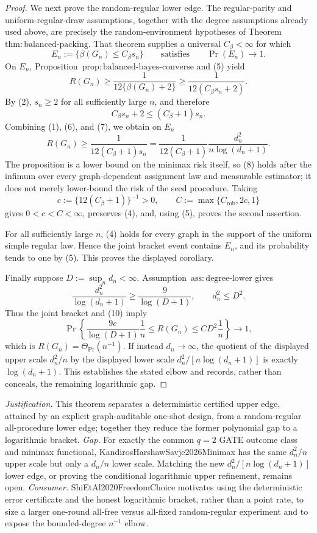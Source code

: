 \documentclass{article}
\begin{document}
\begin{proof}
We next prove the random-regular lower edge.  The regular-parity and uniform-regular-draw assumptions, together with the degree assumptions already used above, are precisely the random-environment hypotheses of Theorem~\(\mathrm{thm{:}balanced\mbox{-}packing}\).  That theorem supplies a universal \(C_\beta<\infty\) for which
\[
E_n:=\{\beta(G_n)\le C_\beta s_n\}
\qquad\text{satisfies}\qquad
\Pr(E_n)\longrightarrow1.
\tag{5}
\]
On \(E_n\), Proposition~\(\mathrm{prop{:}balanced\mbox{-}bayes\mbox{-}converse}\) and (5) yield
\[
R(G_n)
\ge \frac{1}{12\{\beta(G_n)+2\}}
\ge \frac{1}{12(C_\beta s_n+2)}.
\tag{6}
\]
By (2), \(s_n\ge2\) for all sufficiently large \(n\), and therefore
\[
C_\beta s_n+2\le(C_\beta+1)s_n.
\tag{7}
\]
Combining (1), (6), and (7), we obtain on \(E_n\)
\[
R(G_n)
\ge \frac{1}{12(C_\beta+1)s_n}
=\frac{1}{12(C_\beta+1)}
  \frac{d_n^2}{n\log(d_n+1)}.
\tag{8}
\]
The proposition is a lower bound on the minimax risk itself, so (8) holds after the infimum over every graph-dependent assignment law and measurable estimator; it does not merely lower-bound the risk of the seed procedure.  Taking
\[
c:=\{12(C_\beta+1)\}^{-1}>0,
\qquad
C:=\max\{C_{\mathrm{rob}},2c,1\}
\tag{9}
\]
gives \(0<c<C<\infty\), preserves (4), and, using (5), proves the second assertion.

For all sufficiently large \(n\), (4) holds for every graph in the support of the uniform simple regular law.  Hence the joint bracket event contains \(E_n\), and its probability tends to one by (5).  This proves the displayed corollary.

Finally suppose \(D:=\sup_n d_n<\infty\).  Assumption~\(\mathrm{ass{:}degree\mbox{-}lower}\) gives
\[
\frac{d_n^2}{\log(d_n+1)}\ge\frac{9}{\log(D+1)},
\qquad
d_n^2\le D^2.
\tag{10}
\]
Thus the joint bracket and (10) imply
\[
\Pr\!\left\{
\frac{9c}{\log(D+1)}\frac1n
\le R(G_n)\le
CD^2\frac1n
\right\}\longrightarrow1,
\tag{11}
\]
which is \(R(G_n)=\Theta_{\Pr}(n^{-1})\).  If instead \(d_n\to\infty\), the quotient of the displayed upper scale \(d_n^2/n\) by the displayed lower scale \(d_n^2/[n\log(d_n+1)]\) is exactly \(\log(d_n+1)\).  This establishes the stated elbow and records, rather than conceals, the remaining logarithmic gap.
\end{proof}
\par\smallskip\noindent \textit{Justification.} This theorem separates a deterministic certified upper edge, attained by an explicit graph-auditable one-shot design, from a random-regular all-procedure lower edge; together they reduce the former polynomial gap to a logarithmic bracket. \textit{Gap.} For exactly the common \(q=2\) GATE outcome class and minimax functional, KandirosHarshawSavje2026Minimax has the same \(d_n^2/n\) upper scale but only a \(d_n/n\) lower scale. Matching the new \(d_n^2/[n\log(d_n+1)]\) lower edge, or proving the conditional logarithmic upper refinement, remains open. \textit{Consumer.} ShiEtAl2020FreedomChoice motivates using the deterministic error certificate and the honest logarithmic bracket, rather than a point rate, to size a larger one-round all-free versus all-fixed random-regular experiment and to expose the bounded-degree \(n^{-1}\) elbow.
\end{document}
